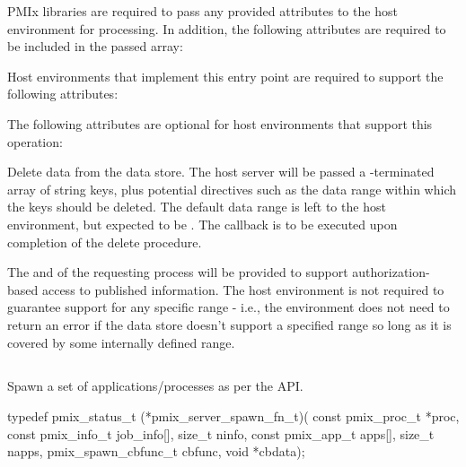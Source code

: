 \reqattrstart
\ac{PMIx} libraries are required to pass any provided attributes to the host environment for processing. In addition, the following attributes are required to be included in the passed  array:


\divider

Host environments that implement this entry point are required to support the following attributes:


\reqattrend

\optattrstart
The following attributes are optional for host environments that support this operation:


\optattrend

\descr

Delete data from the data store.
The host server will be passed a -terminated array of string keys, plus potential directives such as the data range within which the keys should be deleted. The default data range is left to the host environment, but expected to be .
The callback is to be executed upon completion of the delete procedure.

\advicermstart
The  and  of the requesting process will be provided to support authorization-based access to published information. The host environment is not required to guarantee support for any specific range - i.e., the environment does not need to return an error if the data store doesn't support a specified range so long as it is covered by some internally defined range.
\advicermend


\subsection{}

\summary

Spawn a set of applications/processes as per the  API.

\format

\cspecificstart
\begin{codepar}
typedef pmix_status_t (*pmix_server_spawn_fn_t)(
                             const pmix_proc_t *proc,
                             const pmix_info_t job_info[],
                             size_t ninfo,
                             const pmix_app_t apps[],
                             size_t napps,
                             pmix_spawn_cbfunc_t cbfunc,
                             void *cbdata);
\end{codepar}
\cspecificend

